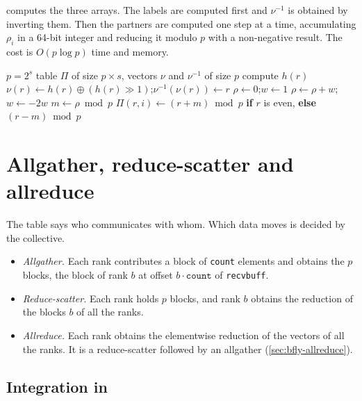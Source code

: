  computes the three arrays.
The labels are computed first and $\nu^{-1}$ is obtained by inverting them. Then the partners are computed one step at a time, accumulating $\rho_i$ in a 64-bit integer and reducing it modulo $p$ with a non-negative result.
The cost is $O(p\log p)$ time and memory.

\begin{algorithm}[t]
\caption{Schedule of the distance-doubling Bine butterfly ($p=2^s$).}
\label{alg:bfly-schedule}
\begin{algorithmic}[1]
\Require $p=2^s$
\Ensure table $\Pi$ of size $p\times s$, vectors $\nu$ and $\nu^{-1}$ of size $p$
  \State compute $h(r)$ 
  \State $\nu(r)\gets h(r)\oplus(h(r)\gg1)$;\quad $\nu^{-1}(\nu(r))\gets r$
\EndFor
\State $\rho\gets0$;\quad $w\gets1$
  \State $\rho\gets\rho+w$;\quad $w\gets-2w$ 
  \State $m\gets\rho\bmod p$ 
    \State $\Pi(r,i)\gets (r+m)\bmod p$ \textbf{if} $r$ is even, \textbf{else} $(r-m)\bmod p$
  \EndFor
\EndFor
\end{algorithmic}
\end{algorithm}

\section{Allgather, reduce-scatter and allreduce}\label{sec:bfly-collectives}

The table says who communicates with whom. Which data moves is decided by the collective.
\begin{itemize}
  \item \emph{Allgather.} Each rank contributes a block of \texttt{count} elements and obtains the $p$ blocks, the block of rank $b$ at offset $b\cdot\texttt{count}$ of \texttt{recvbuff}.
  \item \emph{Reduce-scatter.} Each rank holds $p$ blocks, and rank $b$ obtains the reduction of the blocks $b$ of all the ranks.
  \item \emph{Allreduce.} Each rank obtains the elementwise reduction of the vectors of all the ranks. It is a reduce-scatter followed by an allgather (\cref{sec:bfly-allreduce}).
\end{itemize}

\subsection{Integration in \nccl{}}

